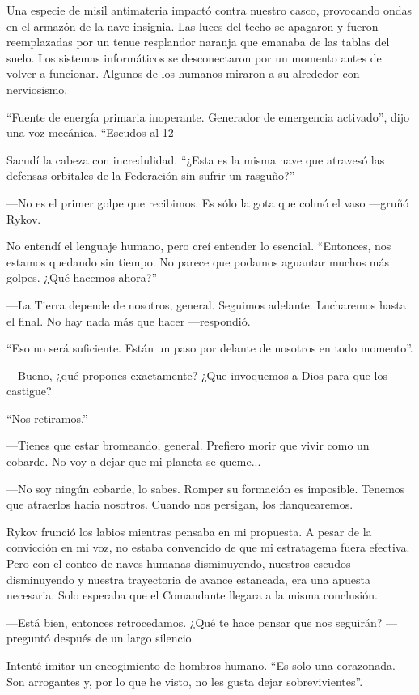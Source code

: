 Una especie de misil antimateria impactó contra nuestro casco, provocando ondas en el armazón de la nave insignia. Las luces del techo se apagaron y fueron reemplazadas por un tenue resplandor naranja que emanaba de las tablas del suelo. Los sistemas informáticos se desconectaron por un momento antes de volver a funcionar. Algunos de los humanos miraron a su alrededor con nerviosismo.

``Fuente de energía primaria inoperante. Generador de emergencia activado'', dijo una voz mecánica. ``Escudos al 12%

Sacudí la cabeza con incredulidad. ``¿Esta es la misma nave que atravesó las defensas orbitales de la Federación sin sufrir un rasguño?''

—No es el primer golpe que recibimos. Es sólo la gota que colmó el vaso —gruñó Rykov.

No entendí el lenguaje humano, pero creí entender lo esencial. ``Entonces, nos estamos quedando sin tiempo. No parece que podamos aguantar muchos más golpes. ¿Qué hacemos ahora?''

—La Tierra depende de nosotros, general. Seguimos adelante. Lucharemos hasta el final. No hay nada más que hacer —respondió.

``Eso no será suficiente. Están un paso por delante de nosotros en todo momento''.

—Bueno, ¿qué propones exactamente? ¿Que invoquemos a Dios para que los castigue?

``Nos retiramos.''

—Tienes que estar bromeando, general. Prefiero morir que vivir como un cobarde. No voy a dejar que mi planeta se queme...

—No soy ningún cobarde, lo sabes. Romper su formación es imposible. Tenemos que atraerlos hacia nosotros. Cuando nos persigan, los flanquearemos.

Rykov frunció los labios mientras pensaba en mi propuesta. A pesar de la convicción en mi voz, no estaba convencido de que mi estratagema fuera efectiva. Pero con el conteo de naves humanas disminuyendo, nuestros escudos disminuyendo y nuestra trayectoria de avance estancada, era una apuesta necesaria. Solo esperaba que el Comandante llegara a la misma conclusión.

—Está bien, entonces retrocedamos. ¿Qué te hace pensar que nos seguirán? —preguntó después de un largo silencio.

Intenté imitar un encogimiento de hombros humano. ``Es solo una corazonada. Son arrogantes y, por lo que he visto, no les gusta dejar sobrevivientes''.

